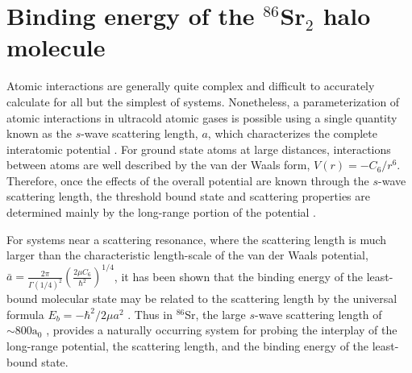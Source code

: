 \chapter{Binding energy of the $^{86}$Sr$_2$ halo molecule} \label{ch:chap5}
Atomic interactions are generally quite complex and difficult to accurately calculate for all but the simplest of systems.
Nonetheless, a parameterization of atomic interactions in ultracold atomic gases is possible using a single quantity known as the $s$-wave scattering length, $a$, which characterizes the complete interatomic potential \cite{Julienne2009a}.
For ground state atoms at large distances, interactions between atoms are well described by the van der Waals form, $V(r)=-C_6/r^6$. 
Therefore, once the effects of the overall potential are known through the $s$-wave scattering length, the threshold bound state and scattering properties are determined mainly by the long-range portion of the potential \cite{Jones2006}.

For systems near a scattering resonance, where the scattering length is much larger than the characteristic length-scale of the van der Waals potential, $\bar{a}=\frac{2 \pi}{\Gamma(1/4)^2} \left( \frac{2 \mu C_6}{\hbar^2} \right)^{1/4}$, it has been shown that the binding energy of the least-bound molecular state may be related to the scattering length by the universal formula $E_b=-\hbar^2/2 \mu a^2$ \cite{fks96,gao04,Julienne2006}.
Thus in $^{86}$Sr, the large $s$-wave scattering length of $\sim\!800\text{a}_0$ \cite{Stein2010}, provides a naturally occurring system for probing the interplay of the long-range potential, the scattering length, and the binding energy of the least-bound state.

%
%
%


